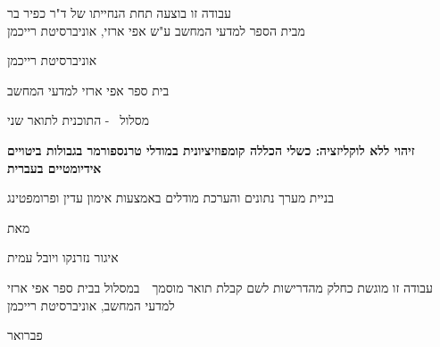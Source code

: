 \documentclass[11pt, a4paper]{report}
\providecommand{\hypersetup}[1]{}
\begin{document}
\clearpage
\thispagestyle{empty}
\vspace*{\fill}
\begin{center}
\begin{otherlanguage}{hebrew}
עבודה זו בוצעה תחת הנחייתו של ד"ר כפיר בר\\
מבית הספר למדעי המחשב ע"ש אפי ארזי, אוניברסיטת רייכמן
\end{otherlanguage}
\end{center}
\vspace*{\fill}
\clearpage



\hypersetup{pageanchor=false}   %
\begin{titlepage}
\centering
\vspace*{2cm}

\begin{otherlanguage}{hebrew}

{\Large אוניברסיטת רייכמן\par}
\vspace{0.3cm}
{\large בית ספר אפי ארזי למדעי המחשב\par}
{\large מסלול  \, - התוכנית לתואר שני\par}

\vspace{3cm}

{\LARGE \bfseries זיהוי ללא לוקליזציה: כשלי הכללה קומפוזיציונית במודלי טרנספורמר בגבולות ביטויים אידיומטיים בעברית\par}
\vspace{0.5cm}
{\large בניית מערך נתונים והערכת מודלים באמצעות אימון עדין ופרומפטינג\par}

\vspace{3cm}

{\large מאת\par}
{\Large איגור נזרנקו ויובל עמית\par}

\vspace{3cm}

{\normalsize
  עבודה זו מוגשת כחלק מהדרישות לשם קבלת תואר מוסמך~\  במסלול
  בבית ספר אפי ארזי למדעי המחשב, אוניברסיטת רייכמן
\par}

\vspace{2cm}

{\Large פברואר \par}

\end{otherlanguage}

\end{titlepage}
\end{document}
